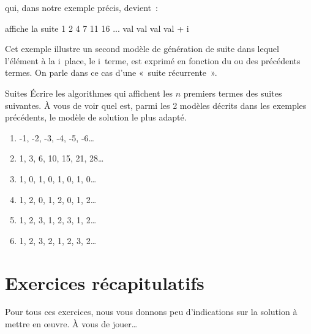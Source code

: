 		qui, dans notre exemple précis, devient~:

		\begin{LDA}
			\LComment affiche la suite 1 2 4 7 11 16 ...
				\Let val 
					\Write val
					\Let val \Gets val + i
				\EndFor
			\EndAlgo
		\end{LDA}

        Cet exemple illustre un second modèle de génération
        de suite dans lequel l'élément à la i\ieme\ place, le i\ieme\
        terme, est 
        exprimé en fonction du ou des précédents termes. On parle
        dans ce cas d'une «~suite récurrente~». 
                     
                   
		\begin{Exercice}{Suites}
			Écrire les algorithmes qui affichent
			les $n$ premiers termes des suites suivantes.
			À vous de voir quel est, parmi les 2 modèles 
			décrits dans les exemples précédents, le 
			modèle de solution
			le plus adapté.
			\begin{enumerate}[label=\alph*)]
			\item -1, -2, -3, -4, -5, -6\dots
			\item 1, 3, 6, 10, 15, 21, 28\dots
			\item 1, 0, 1, 0, 1, 0, 1, 0\dots
			\item 1, 2, 0, 1, 2, 0, 1, 2\dots
			\item 1, 2, 3, 1, 2, 3, 1, 2\dots
			\item 1, 2, 3, 2, 1, 2, 3, 2\dots
			\end{enumerate}			
		\end{Exercice}
				
\section{Exercices récapitulatifs}

	Pour tous ces exercices,
	nous vous donnons peu d’indications sur la solution à
	mettre en \oe{}uvre.
	À vous de jouer\dots{}
	
